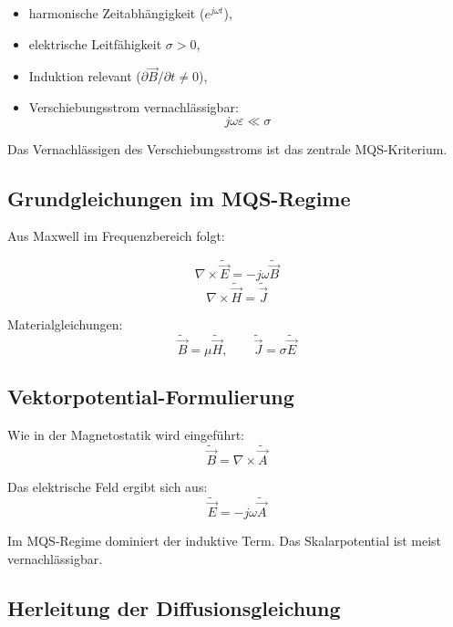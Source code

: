 \documentclass[a4paper]{article}
\newcommand{\E}{\vec E}
\newcommand{\Hf}{\vec H}
\newcommand{\B}{\vec B}
\newcommand{\J}{\vec J}
\newcommand{\A}{\vec A}
\newcommand{\eps}{\varepsilon}
\begin{document}
\begin{itemize}
  \item harmonische Zeitabhängigkeit ($e^{j\omega t}$),
  \item elektrische Leitfähigkeit $\sigma > 0$,
  \item Induktion relevant ($\partial \B/\partial t \neq 0$),
  \item Verschiebungsstrom vernachlässigbar:
  \[
  j\omega\eps \ll \sigma
  \]
\end{itemize}

\begin{merke}
Das Vernachlässigen des Verschiebungsstroms ist das zentrale MQS-Kriterium.
\end{merke}

\subsection{Grundgleichungen im MQS-Regime}

Aus Maxwell im Frequenzbereich folgt:

\[
\nabla \times \tilde{\E} = -j\omega \tilde{\B}
\]
\[
\nabla \times \tilde{\Hf} = \tilde{\J}
\]

Materialgleichungen:
\[
\tilde{\B} = \mu \tilde{\Hf},
\qquad
\tilde{\J} = \sigma \tilde{\E}
\]

\subsection{Vektorpotential-Formulierung}

Wie in der Magnetostatik wird eingeführt:
\[
\tilde{\B} = \nabla \times \tilde{\A}
\]

Das elektrische Feld ergibt sich aus:
\[
\tilde{\E} = -j\omega \tilde{\A}
\]

\begin{merke}
Im MQS-Regime dominiert der induktive Term.
Das Skalarpotential ist meist vernachlässigbar.
\end{merke}

\subsection{Herleitung der Diffusionsgleichung}
\end{document}
